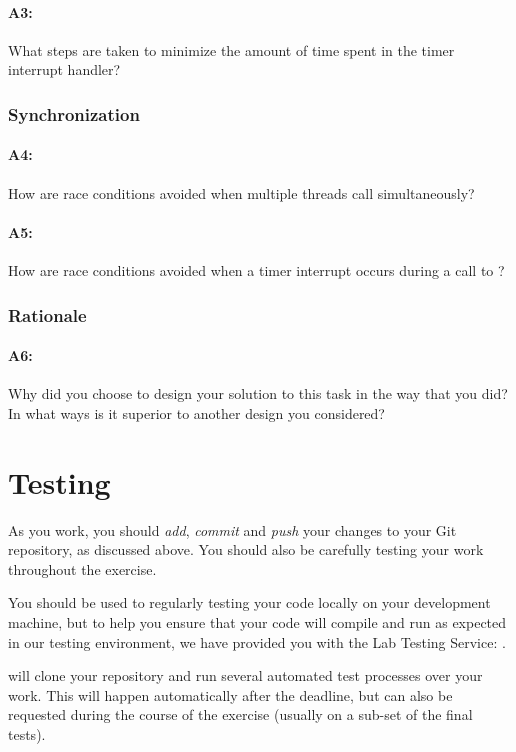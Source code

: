 \documentclass[a4paper,11pt]{article}
\begin{document}
\paragraph{A3:}
What steps are taken to minimize the amount of time spent in the timer interrupt handler?

\subsubsection*{Synchronization}

\paragraph{A4:}
How are race conditions avoided when multiple threads call  simultaneously?

\paragraph{A5:}
How are race conditions avoided when a timer interrupt occurs during a call to ?

\subsubsection*{Rationale}

\paragraph{A6:}
Why did you choose to design your solution to this task in the way that you did? \\
In what ways is it superior to another design you considered?

\pagebreak
\section*{Testing}
As you work, you should \emph{add}, \emph{commit} and \emph{push} your changes to your Git repository, as discussed above.
You should also be carefully testing your work throughout the exercise. 

You should be used to regularly testing your code locally on your development machine, 
but to help you ensure that your code will compile and run as expected in our testing environment,
we have provided you with the Lab Testing Service: .

 will clone your  repository and run several automated test processes over your work.
This will happen automatically after the deadline, but can also be requested during the course of the exercise (usually on a sub-set of the final tests). 
\end{document}
